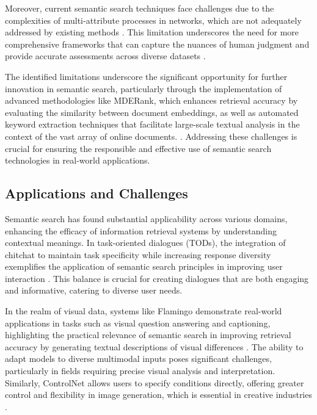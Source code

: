 Moreover, current semantic search techniques face challenges due to the complexities of multi-attribute processes in networks, which are not adequately addressed by existing methods \cite{shakarian2022reasoningcomplexnetworkslogic}. This limitation underscores the need for more comprehensive frameworks that can capture the nuances of human judgment and provide accurate assessments across diverse datasets \cite{yamshchikov2020styletransferparaphraselookingsensible}. 



The identified limitations underscore the significant opportunity for further innovation in semantic search, particularly through the implementation of advanced methodologies like MDERank, which enhances retrieval accuracy by evaluating the similarity between document embeddings, as well as automated keyword extraction techniques that facilitate large-scale textual analysis in the context of the vast array of online documents. \cite{altuncu2022improvingperformanceautomatickeyword}. Addressing these challenges is crucial for ensuring the responsible and effective use of semantic search technologies in real-world applications.



\subsection{Applications and Challenges} \label{subsec:Applications and Challenges}

Semantic search has found substantial applicability across various domains, enhancing the efficacy of information retrieval systems by understanding contextual meanings. In task-oriented dialogues (TODs), the integration of chitchat to maintain task specificity while increasing response diversity exemplifies the application of semantic search principles in improving user interaction \cite{stricker2024enhancingtaskorienteddialogueschitchat}. This balance is crucial for creating dialogues that are both engaging and informative, catering to diverse user needs.



In the realm of visual data, systems like Flamingo demonstrate real-world applications in tasks such as visual question answering and captioning, highlighting the practical relevance of semantic search in improving retrieval accuracy by generating textual descriptions of visual differences \cite{alayrac2022flamingo}. The ability to adapt models to diverse multimodal inputs poses significant challenges, particularly in fields requiring precise visual analysis and interpretation. Similarly, ControlNet allows users to specify conditions directly, offering greater control and flexibility in image generation, which is essential in creative industries \cite{zhang2023adding}.



